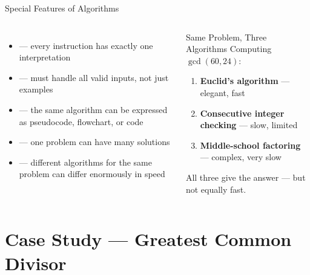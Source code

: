 \documentclass[aspectratio=169]{beamer}
\begin{document}
\begin{frame}{Special Features of Algorithms}
  \begin{columns}[T]
      \begin{itemize}
        \item {} — every instruction has exactly
              one interpretation
        \item {} — must handle all valid inputs,
              not just examples
        \item {} — the same algorithm
              can be expressed as pseudocode, flowchart, or code
        \item {} — one problem can have
              many solutions
        \item {} — different algorithms
              for the same problem can differ enormously in speed
      \end{itemize}
      \begin{exampleblock}{Same Problem, Three Algorithms}
        Computing $\gcd(60, 24)$:
        \begin{enumerate}
          \item \textbf{Euclid's algorithm} — elegant, fast
          \item \textbf{Consecutive integer checking} — slow, limited
          \item \textbf{Middle-school factoring} — complex, very slow
        \end{enumerate}
        \vspace{0.3em}
        All three give the answer  — but not equally fast.
      \end{exampleblock}
  \end{columns}
\end{frame}

\section{Case Study — Greatest Common Divisor}
\end{document}
